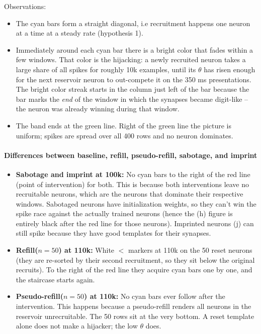 \documentclass{article}
\begin{document}
Observations:
\begin{itemize}
    \item The cyan bars form a straight diagonal, i.e recruitment happens one neuron at a
          time at a steady rate (hypothesis 1).
    \item Immediately around each cyan bar there is a bright color that fades within a few windows. That color is the
          hijacking: a newly recruited neuron takes a large share of all spikes for roughly 10k examples, until its
          $\theta$ has risen enough for the next reservoir neuron to out-compete it on the 350 ms presentations.
          The bright color streak starts in the column just left of the bar because the bar marks the \emph{end} of the window in which the
          synapses became digit-like
          -- the neuron was already winning during that window.
    \item The band ends at the green line. Right of the green line the picture is uniform;
          spikes are spread over all 400 rows and no neuron dominates.
\end{itemize}

\paragraph{Differences between baseline, refill, pseudo-refill, sabotage, and imprint}
\begin{itemize}
    \item \textbf{Sabotage and imprint at 100k:} No cyan bars to the right of the red line (point of intervention) for both. This is
          because both interventions leave no recruitable neurons, which are the neurons that dominate their respective windows.
          Sabotaged neurons have initialization weights, so they can't win the spike race against the actually trained neurons (hence the
          (h) figure is entirely black after the red line for those neurons). Imprinted neurons (j) can still spike because they have
          good templates for their synapses.
    \item \textbf{Refill($n=50$) at 110k:} White $<$ markers at 110k on the 50 reset neurons (they are re-sorted by
          their second recruitment, so they sit below the original recruits). To the right of the red line they
          acquire cyan bars one by one, and the staircase starts again.
    \item \textbf{Pseudo-refill($n=50$) at 110k:} No cyan bars ever follow after the intervention. This happens because a pseudo-refill renders all neurons in the reservoir unrecruitable.
          The 50 rows sit at the very bottom. A reset template alone does not make a hijacker; the low $\theta$ does.
\end{itemize}
\end{document}
